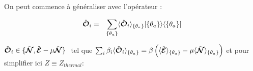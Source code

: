 \begin{figure}[H]
	\centering 
	\captionsetup{skip=10pt} %
\end{figure}



	On peut commence à généraliser avec l'opérateur :
	
	
	\begin{eqnarray}
		\hat{\bm{\mathcal{O}}}_i & = & \sum_{\{\theta_a \}} \langle \hat{\bm{\mathcal{O}}}_i \rangle_{\{\theta_a \}}  \vert \{ \theta_a\}\rangle	\langle \{ \theta_a \}\vert
	\end{eqnarray}
	
	$\operator{\mathcal{O}}_i \in \{\operator{\mathcal{N}} , \operator{\mathcal{E}} - \mu \operator{\mathcal{N}} \} $  tel que $\sum_i \beta_i \langle \hat{\bm{\mathcal{O}}}_i \rangle_{\{\theta_a \}} = \beta \left ( \langle \hat{\bm{\mathcal{E}}} \rangle_{\{\theta_a \}}   - \mu \langle \hat{\bm{\mathcal{N}}} \rangle_{\{\theta_a \}} \right ) $ et pour simplifier ici $Z \equiv Z_{thermal}$:
	

